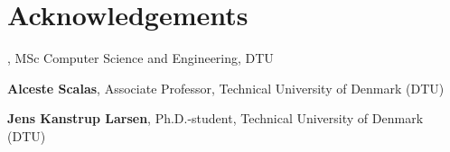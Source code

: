 \section*{Acknowledgements}
\textbf{\thesisauthor}, MSc Computer Science and Engineering, DTU \newline

\textbf{Alceste Scalas}, Associate Professor, Technical University of Denmark (DTU) \newline
[text]

\textbf{Jens Kanstrup Larsen}, Ph.D.-student, Technical University of Denmark (DTU) \newline
[text]

